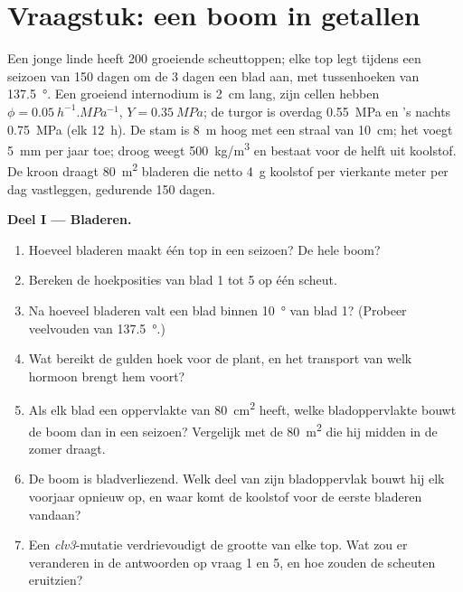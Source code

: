 \section{Vraagstuk: een boom in getallen}

\begin{problem}
\label{pb:b2:plant-meristems:1}
Een jonge linde heeft \num{200} groeiende scheuttoppen; elke top legt tijdens
een seizoen van \num{150} dagen om de \num{3} dagen een blad aan, met
tussenhoeken van \qty{137.5}{\degree}. Een groeiend internodium is
\qty{2}{cm} lang, zijn cellen hebben $\phi = \qty{0.05}{h^{-1}.MPa^{-1}}$,
$Y =
\qty{0.35}{MPa}$; de turgor is overdag \qty{0.55}{MPa} en 's nachts
\qty{0.75}{MPa} (elk \qty{12}{h}). De stam is \qty{8}{m} hoog met een straal
van \qty{10}{cm}; het  voegt \qty{5}{mm} per jaar toe; droog 
weegt \qty{500}{kg/m^3} en bestaat voor de helft uit koolstof. De kroon draagt
\qty{80}{m^2} bladeren die netto \qty{4}{g} koolstof per vierkante meter per
dag vastleggen, gedurende \num{150} dagen.

\medskip
\noindent\textbf{Deel I --- Bladeren.}
\begin{enumerate}
  \item Hoeveel bladeren maakt één top in een seizoen? De hele boom?
  \item Bereken de hoekposities van blad 1 tot 5 op één scheut.
  \item Na hoeveel bladeren valt een blad binnen \qty{10}{\degree} van
        blad 1? (Probeer veelvouden van \qty{137.5}{\degree}.)
  \item Wat bereikt de gulden hoek voor de plant, en het transport van welk
        hormoon brengt hem voort?
  \item Als elk blad een oppervlakte van \qty{80}{cm^2} heeft, welke
        bladoppervlakte bouwt de boom dan in een seizoen? Vergelijk met de
        \qty{80}{m^2} die hij midden in de zomer draagt.
  \item De boom is bladverliezend. Welk deel van zijn bladoppervlak bouwt
        hij elk voorjaar opnieuw op, en waar komt de koolstof voor de eerste
        bladeren vandaan?
  \item Een \emph{clv3}-mutatie verdrievoudigt de grootte van elke top.
        Wat zou er veranderen in de antwoorden op vraag 1 en 5, en hoe zouden
        de scheuten eruitzien?
\end{enumerate}


\end{problem}
